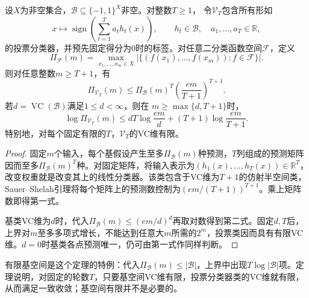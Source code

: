 \begin{theorem}[投票假设空间的生长函数]
\label{thm:vote-growth-infinite}
设$X$为非空集合，$\mathcal B\subseteq\{-1,1\}^X$非空。对整数$T\geq1$，
令$\mathcal V_T$包含所有形如
\[
 x\mapsto\operatorname{sign}\!\left(\sum_{t=1}^T a_t h_t(x)\right),
 \qquad h_t\in\mathcal B,\quad a_1,\ldots,a_T\in\mathbb R,
\]
的投票分类器，并预先固定得分为0时的标签。对任意二分类函数空间$\mathcal F$，定义
\[
 \Pi_{\mathcal F}(m)
 =\max_{x_1,\ldots,x_m\in X}
 \left|\{(f(x_1),\ldots,f(x_m)):f\in\mathcal F\}\right|.
\]
则对任意整数$m\geq T+1$，有
\begin{equation}
 \Pi_{\mathcal V_T}(m)
 \leq\Pi_{\mathcal B}(m)^T
       \left(\frac{em}{T+1}\right)^{T+1}.
 \label{eq:boosting-vote-growth}
\end{equation}
若$d=\operatorname{VC}(\mathcal B)$满足$1\leq d<\infty$，则在
$m\geq\max\{d,T+1\}$时，
\begin{equation}
 \log\Pi_{\mathcal V_T}(m)
 \leq dT\log\frac{em}{d}+(T+1)\log\frac{em}{T+1}.
 \label{eq:infinite-boosting-growth}
\end{equation}
特别地，对每个固定有限的$T$，$\mathcal V_T$的VC维有限。
\end{theorem}

\begin{proof}
固定$m$个输入，每个基假设产生至多$\Pi_{\mathcal B}(m)$种预测，$T$列组成的预测矩阵因而至多$\Pi_{\mathcal B}(m)^T$种。对固定矩阵，将输入表示为$(h_1(x),\ldots,h_T(x))\in\mathbb R^T$，改变权重就是改变其上的线性分类器。该类包含于VC维为$T+1$的仿射半空间类，Sauer--Shelah引理将每个矩阵上的预测数控制为$(em/(T+1))^{T+1}$。乘上矩阵数即得第一式。

基类VC维为$d$时，代入$\Pi_{\mathcal B}(m)\leq(em/d)^d$再取对数得到第二式。固定$d,T$后，上界对$m$至多多项式增长，不能达到任意大$m$所需的$2^m$，投票类因而具有有限VC维。$d=0$时基类各点预测唯一，仍可由第一式作同样判断。
\end{proof}

有限基空间是这个定理的特例：代入$\Pi_{\mathcal B}(m)\leq|\mathcal B|$，上界中出现$T\log|\mathcal B|$项。定理说明，对固定的轮数$T$，只要基空间VC维有限，投票分类器类的VC维就有限，从而满足一致收敛；基空间有限并不是必要的。

